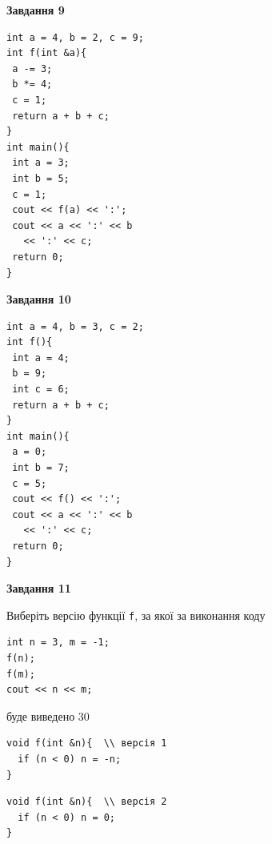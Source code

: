 \documentclass[12pt, ukrainian]{article}
\def\code#1{\Verb!#1!}
\begin{document}
{\begin {large}
\begin{minipage}[t]{11.0cm}
\end{minipage}


\begin{minipage}[t]{7.0cm}

\begin{center}
\textbf{Завдання 9}
\end{center}
\vspace{-8mm}

\begin{verbatim}
int a = 4, b = 2, c = 9;
int f(int &a){
 a -= 3;
 b *= 4;
 c = 1;
 return a + b + c;
}
int main(){
 int a = 3;
 int b = 5;
 c = 1;
 cout << f(a) << ':';
 cout << a << ':' << b 
   << ':' << c;
 return 0;
}
\end{verbatim}



\begin{center}
\textbf{Завдання 10}
\end{center}
\vspace{-8mm}

\begin{verbatim}
int a = 4, b = 3, c = 2;
int f(){
 int a = 4;
 b = 9;
 int c = 6;
 return a + b + c;
}
int main(){
 a = 0;
 int b = 7;
 c = 5;
 cout << f() << ':';
 cout << a << ':' << b 
   << ':' << c;
 return 0;
}
\end{verbatim}

\end{minipage}
\vline \hspace{1mm}
\begin{minipage}[t]{11.0cm}

\begin{center}
\textbf{Завдання 11}
\end{center}
Виберіть версію функції \code{f}, за якої за виконання коду
\begin{verbatim}
int n = 3, m = -1;
f(n);
f(m);
cout << n << m;
\end{verbatim}

буде виведено 30

\begin{verbatim}
void f(int &n){  \\ версія 1
  if (n < 0) n = -n;
}
\end{verbatim}

\vspace{-8mm}\begin{verbatim}
void f(int &n){  \\ версія 2
  if (n < 0) n = 0;
}
\end{verbatim}


\end{minipage}
\end{large}}
\end{document}
